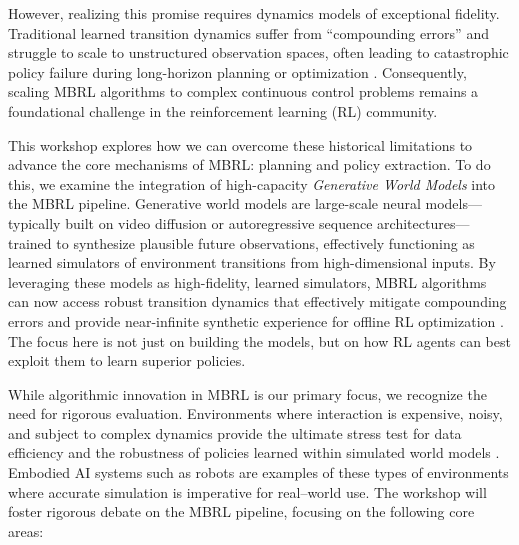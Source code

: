 \documentclass[10pt]{article} %
\begin{document}
However, realizing this promise requires dynamics models of exceptional fidelity. Traditional learned transition dynamics suffer from ``compounding errors'' and struggle to scale to unstructured observation spaces, often leading to catastrophic policy failure during long-horizon planning or optimization \citep{chua2018deep}. Consequently, scaling MBRL algorithms to complex continuous control problems remains a foundational challenge in the reinforcement learning (RL) community.


This workshop explores how we can overcome these historical limitations to advance the core mechanisms of MBRL: planning and policy extraction. To do this, we examine the integration of high-capacity \textit{Generative World Models} into the MBRL pipeline. Generative world models are large-scale neural models---typically built on video diffusion or autoregressive sequence architectures---trained to synthesize plausible future observations, effectively functioning as learned simulators of environment transitions from high-dimensional inputs. By leveraging these models as high-fidelity, learned simulators, MBRL algorithms can now access robust transition dynamics that effectively mitigate compounding errors and provide near-infinite synthetic experience for offline RL optimization \citep{hafner2023dreamerv3}. The focus here is not just on building the models, but on how RL agents can best exploit them to learn superior policies.



While algorithmic innovation in MBRL is our primary focus, we recognize the need for rigorous evaluation. Environments where interaction is expensive, noisy, and subject to complex dynamics provide the ultimate stress test for data efficiency and the robustness of policies learned within simulated world models \citep{akkaya2019solving}. Embodied AI systems such as robots are examples of these types of environments where accurate simulation is imperative for real--world use.  The workshop will foster rigorous debate on the MBRL pipeline, focusing on the following core areas:
\end{document}
